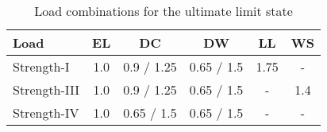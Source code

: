 \begin{table}[H]
\caption{Load combinations for the ultimate limit state}
\centering
\begin{tabular}{lccccc}
\hline
Load         & EL  & DC         & DW         & LL   & WS  \\ \hline
Strength-I   & 1.0 & 0.9 / 1.25 & 0.65 / 1.5 & 1.75 & -   \\
Strength-III & 1.0 & 0.9 / 1.25 & 0.65 / 1.5 & -    & 1.4 \\ 
Strength-IV  & 1.0 & 0.65 / 1.5 & 0.65 / 1.5 & -    & - \\ \hline
\end{tabular}
\end{table}